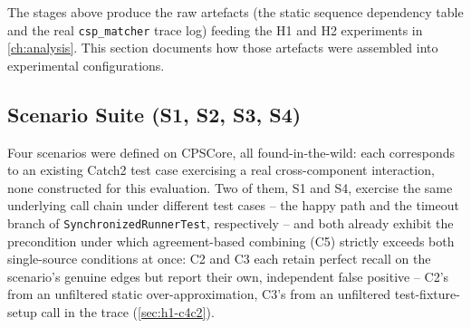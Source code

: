 The stages above produce the raw artefacts (the static sequence
dependency table and the real \texttt{csp\_matcher} trace log) feeding
the H1 and H2 experiments in \cref{ch:analysis}. This section documents
how those artefacts were assembled into experimental configurations.

\subsection{Scenario Suite (S1, S2, S3, S4)}\label{sec:scenarios}

Four scenarios were defined on CPSCore, all found-in-the-wild: each
corresponds to an existing Catch2 test case exercising a real
cross-component interaction, none constructed for this evaluation. Two
of them, S1 and S4, exercise the same underlying call chain under
different test cases -- the happy path and the timeout branch of
\texttt{SynchronizedRunnerTest}, respectively -- and both already
exhibit the precondition under which agreement-based combining (C5)
strictly exceeds both single-source conditions at once: C2 and C3 each
retain perfect recall on the scenario's genuine edges but report their
own, independent false positive -- C2's from an unfiltered static
over-approximation, C3's from an unfiltered test-fixture-setup call in
the trace (\cref{sec:h1-c4c2}).

